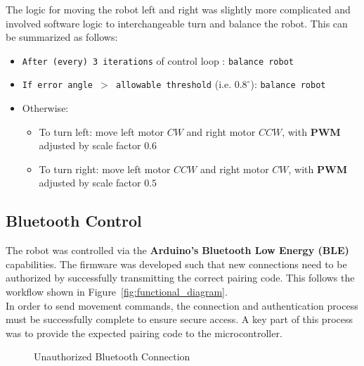 \documentclass{article}
\begin{document}
\begin{minipage}{\linewidth}
    The logic for moving the robot left and right was slightly more complicated and involved
    software logic to interchangeable turn and balance the robot. This can be summarized as follows: \\
\end{minipage}

\begin{itemize}
    \item \texttt{After (every) 3 iterations} of control loop : \texttt{balance robot}
    \item \texttt{If error angle $>$ allowable threshold} (i.e. $0.8^\circ$): \texttt{balance robot}
    \item Otherwise:
    \begin{itemize}
        \item To turn left: move left motor $CW$ and right motor $CCW$, with \textbf{PWM} adjusted by scale factor $0.6$
        \item To turn right: move left motor $CCW$ and right motor $CW$,  with \textbf{PWM} adjusted by scale factor $0.5$
    \end{itemize}
\end{itemize}

\subsection{Bluetooth Control}

\begin{minipage}{\linewidth}
    The robot was controlled via the \textbf{Arduino's} \textbf{Bluetooth Low Energy (BLE)} capabilities.
    The firmware was developed such that new connections need to be authorized by successfully transmitting
    the correct pairing code. This follows the workflow shown in Figure~\ref{fig:functional_diagram}. \\

    In order to send movement commands, the connection and authentication process must be successfully complete to ensure secure access. A key
    part of this process was to provide the expected pairing code to the microcontroller. \\
\end{minipage}

\begin{figure}[H]
    \centering
    \caption{Unauthorized Bluetooth Connection}
    \label{fig:bluetooth_unauthorized}
\end{figure}
\end{document}
